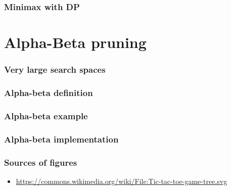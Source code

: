 \documentclass[12pt]{beamer}
\begin{document}
\begin{frame}
\frametitle{Minimax with DP}
\end{frame}

\section{Alpha-Beta pruning}
\begin{frame}
\frametitle{Very large search spaces}
\end{frame}

\begin{frame}
\frametitle{Alpha-beta definition}
\end{frame}

\begin{frame}
\frametitle{Alpha-beta example}
\end{frame}

\begin{frame}
\frametitle{Alpha-beta implementation}
\end{frame}

\begin{frame}
\frametitle{Sources of figures}
\begin{itemize}
\item \url{https://commons.wikimedia.org/wiki/File:Tic-tac-toe-game-tree.svg}
\end{itemize}
\end{frame}
\end{document}
